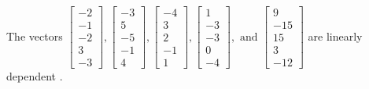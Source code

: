 \begin{exercise}
\begin{exerciseStatement}
  \end{exerciseStatement}
  \begin{exerciseAnswer}
   The vectors \(\left[\begin{array}{r}
-2 \\
-1 \\
-2 \\
3 \\
-3
\end{array}\right] , \left[\begin{array}{r}
-3 \\
5 \\
-5 \\
-1 \\
4
\end{array}\right] , \left[\begin{array}{r}
-4 \\
3 \\
2 \\
-1 \\
1
\end{array}\right] , \left[\begin{array}{r}
1 \\
-3 \\
-3 \\
0 \\
-4
\end{array}\right] , \text{ and } \left[\begin{array}{r}
9 \\
-15 \\
15 \\
3 \\
-12
\end{array}\right]\) are 
  	 linearly dependent  .
  


  \end{exerciseAnswer}
\end{exercise}